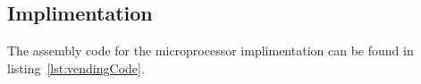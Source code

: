 \subsection{Implimentation}
The assembly code for the microprocessor implimentation can be found in
listing~\ref{lst:vendingCode}.
